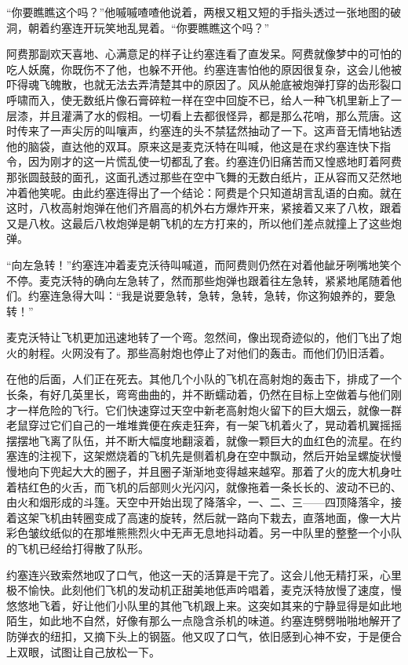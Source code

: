     “你要瞧瞧这个吗？”他嘁嘁喳喳他说着，两根又粗又短的手指头透过一张地图的破洞，朝着约塞连开玩笑地乱晃着。“你要瞧瞧这个吗？”

    阿费那副欢天喜地、心满意足的样子让约塞连看了直发呆。阿费就像梦中的可怕的吃人妖魔，你既伤不了他，也躲不开他。约塞连害怕他的原因很复杂，这会儿他被吓得魂飞魄散，也就无法去弄清楚其中的原因了。风从舱底被炮弹打穿的齿形裂口呼啸而入，使无数纸片像石膏碎粒一样在空中回旋不已，给人一种飞机里新上了一层漆，并且灌满了水的假相。一切看上去都很怪异，都是那么花哨，那么荒唐。这时传来了一声尖厉的叫嚷声，约塞连的头不禁猛然抽动了一下。这声音无情地钻透他的脑袋，直达他的双耳。原来这是麦克沃特在叫喊，他这是在求约塞连快下指令，因为刚才的这一片慌乱使一切都乱了套。约塞连仍旧痛苦而又惶惑地盯着阿费那张圆鼓鼓的面孔，这面孔透过那些在空中飞舞的无数白纸片，正从容而又茫然地冲着他笑呢。由此约塞连得出了一个结论：阿费是个只知道胡言乱语的白痴。就在这时，八枚高射炮弹在他们齐眉高的机外右方爆炸开来，紧接着又来了八枚，跟着又是八枚。这最后八枚炮弹是朝飞机的左方打来的，所以他们差点就撞上了这些炮弹。

    “向左急转！”约塞连冲着麦克沃待叫喊道，而阿费则仍然在对着他龇牙咧嘴地笑个不停。麦克沃特的确向左急转了，然而那些炮弹也跟着往左急转，紧紧地尾随着他们。约塞连急得大叫：“我是说要急转，急转，急转，急转，你这狗娘养的，要急转！”

    麦克沃特让飞机更加迅速地转了一个弯。忽然间，像出现奇迹似的，他们飞出了炮火的射程。火网没有了。那些高射炮也停止了对他们的轰击。而他们仍旧活着。

    在他的后面，人们正在死去。其他几个小队的飞机在高射炮的轰击下，排成了一个长条，有好几英里长，弯弯曲曲的，并不断蠕动着，仍然在目标上空做着与他们刚才一样危险的飞行。它们快速穿过天空中新老高射炮火留下的巨大烟云，就像一群老鼠穿过它们自己的一堆堆粪便在疾走狂奔，有一架飞机着火了，晃动着机翼摇摇摆摆地飞离了队伍，并不断大幅度地翻滚着，就像一颗巨大的血红色的流星。在约塞连的注视下，这架燃烧着的飞机先是侧着机身在空中飘动，然后开始呈螺旋状慢慢地向下兜起大大的圈子，并且圈子渐渐地变得越来越窄。那着了火的庞大机身吐着桔红色的火舌，而飞机的后部则火光闪闪，就像拖着一条长长的、波动不已的、由火和烟形成的斗篷。天空中开始出现了降落伞，一、二、三——四顶降落伞，接着这架飞机由转圈变成了高速的旋转，然后就一路向下栽去，直落地面，像一大片彩色皱纹纸似的在那堆熊熊烈火中无声无息地抖动着。另一中队里的整整一个小队的飞机已经给打得散了队形。
 


    约塞连兴致索然地叹了口气，他这一天的活算是干完了。这会儿他无精打采，心里极不愉快。此刻他们飞机的发动机正甜美地低声吟唱着，麦克沃特放慢了速度，慢悠悠地飞着，好让他们小队里的其他飞机跟上来。这突如其来的宁静显得是如此地陌生，如此地不自然，好像有那么一点隐含杀机的味道。约塞连劈劈啪啪地解开了防弹衣的纽扣，又摘下头上的钢盔。他又叹了口气，依旧感到心神不安，于是便合上双眼，试图让自己放松一下。


